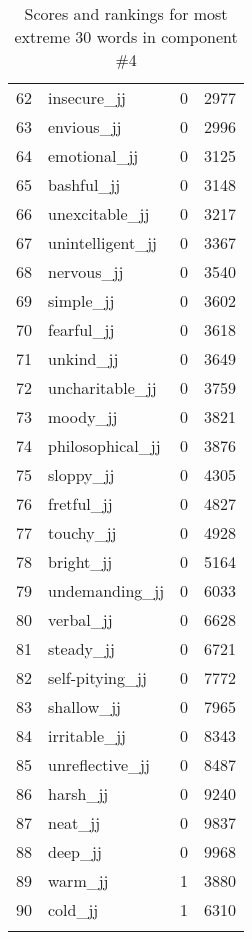 \begin{longtable}[!htbp]{| rlr@{.}l |}
    62 & insecure\_jj & 0 & 2977 \\
    63 & envious\_jj & 0 & 2996 \\
    64 & emotional\_jj & 0 & 3125 \\
    65 & bashful\_jj & 0 & 3148 \\
    66 & unexcitable\_jj & 0 & 3217 \\
    67 & unintelligent\_jj & 0 & 3367 \\
    68 & nervous\_jj & 0 & 3540 \\
    69 & simple\_jj & 0 & 3602 \\
    70 & fearful\_jj & 0 & 3618 \\
    71 & unkind\_jj & 0 & 3649 \\
    72 & uncharitable\_jj & 0 & 3759 \\
    73 & moody\_jj & 0 & 3821 \\
    74 & philosophical\_jj & 0 & 3876 \\
    75 & sloppy\_jj & 0 & 4305 \\
    76 & fretful\_jj & 0 & 4827 \\
    77 & touchy\_jj & 0 & 4928 \\
    78 & bright\_jj & 0 & 5164 \\
    79 & undemanding\_jj & 0 & 6033 \\
    80 & verbal\_jj & 0 & 6628 \\
    81 & steady\_jj & 0 & 6721 \\
    82 & self-pitying\_jj & 0 & 7772 \\
    83 & shallow\_jj & 0 & 7965 \\
    84 & irritable\_jj & 0 & 8343 \\
    85 & unreflective\_jj & 0 & 8487 \\
    86 & harsh\_jj & 0 & 9240 \\
    87 & neat\_jj & 0 & 9837 \\
    88 & deep\_jj & 0 & 9968 \\
    89 & warm\_jj & 1 & 3880 \\
    90 & cold\_jj & 1 & 6310 \\
    \hline
    \caption{Scores and rankings for most extreme 30 words in component \#4} \\
\end{longtable}
